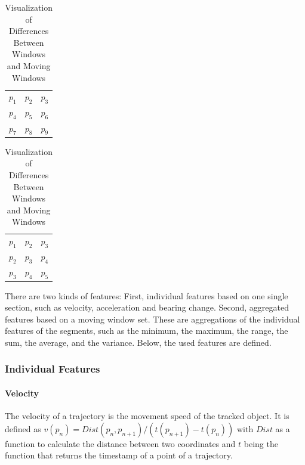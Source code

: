 \begin{table}[!htb]

    \begin{minipage}{.5\linewidth}
        \centering
        \begin{tabular}{|c c c|} 
        \toprule
        \rowcolor{white} $p_1$ & $p_2$ & $p_3$  \\
        $p_4$ & $p_5$ & $p_6$  \\
        \rowcolor{white} $p_7$ & $p_8$ & $p_9$  \\
        \bottomrule
        \end{tabular}
        \caption*{\small Windows of a Trajectory}
    \end{minipage}%
    \begin{minipage}{.5\linewidth}
      \centering
        \begin{tabular}{|c c c|} 
        \toprule
        \rowcolor{white} $p_1$ & $p_2$ & $p_3$  \\
        $p_2$ & $p_3$ & $p_4$  \\
        \rowcolor{white} $p_3$ & $p_4$ & $p_5$  \\
        \bottomrule
        \end{tabular}
    \caption*{\small Moving Windows of a Trajectory}
    \end{minipage} 
    
    \caption{Visualization of Differences Between Windows and Moving Windows}
    \label{table:comp_windows}
\end{table}

There are two kinds of features: First, individual features based on one single section, such as velocity, acceleration and bearing change. Second, aggregated features based on a moving window set. These are aggregations of the individual features of the segments, such as the minimum, the maximum, the range, the sum, the average, and the variance. Below, the used features are defined.

\subsubsection{Individual Features}

\paragraph{Velocity} The velocity of a trajectory is the movement speed of the tracked object. It is defined as $v(p_n) = Dist(p_n, p_{n+1})/(t(p_{n+1}) - t(p_n))$ with $Dist$ as a function to calculate the distance between two coordinates and $t$ being the function that returns the timestamp of a point of a trajectory. \cite{Zheng2008}

